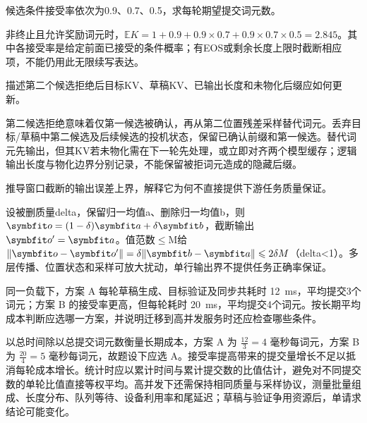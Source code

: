 \begin{exercises}
\begin{exercise} 候选条件接受率依次为0.9、0.7、0.5，求每轮期望提交词元数。

\begin{solution}
非终止且允许奖励词元时，$\mathbb EK=1+0.9+0.9\times0.7+0.9\times0.7\times0.5=2.845$。其中各接受率是给定前面已接受的条件概率；有EOS或剩余长度上限时截断相应项，不能仍用此无限续写表达。
\end{solution}
\end{exercise}

\begin{exercise} 描述第二个候选拒绝后目标KV、草稿KV、已输出长度和未物化后缀应如何更新。

\begin{solution}
第二候选拒绝意味着仅第一候选被确认，再从第二位置残差采样替代词元。丢弃目标/草稿中第二候选及后续候选的投机状态，保留已确认前缀和第一候选。替代词元先输出，但其KV若未物化需在下一轮先处理，或立即对齐两个模型缓存；逻辑输出长度与物化边界分别记录，不能保留被拒词元造成的隐藏后缀。
\end{solution}
\end{exercise}

\begin{exercise}\optional 推导窗口截断的输出误差上界，解释它为何不直接提供下游任务质量保证。

\begin{solution}
设被删质量delta，保留归一均值a、删除归一均值b，则 $\vect{o}=(1-\delta)\vect{a}+\delta \vect{b}$，截断输出 $\vect{o}'=\vect{a}$。值范数$\le$M给 $\|\vect{o}-\vect{o}'\|=\delta\|\vect{b}-\vect{a}\|\le2\delta M$（delta<1）。多层传播、位置状态和采样可放大扰动，单行输出界不提供任务正确率保证。
\end{solution}
\end{exercise}

\begin{exercise} 同一负载下，方案 A 每轮草稿生成、目标验证及同步共耗时 \qty{12}{ms}，平均提交3个词元；方案 B 的接受率更高，但每轮耗时 \qty{20}{ms}，平均提交4个词元。按长期平均成本判断应选哪一方案，并说明迁移到高并发服务时还应检查哪些条件。

\begin{solution}
以总时间除以总提交词元数衡量长期成本，方案 A 为 $\frac{12}{3}=4$ 毫秒每词元，方案 B 为 $\frac{20}{4}=5$ 毫秒每词元，故题设下应选 A。接受率提高带来的提交量增长不足以抵消每轮成本增长。统计时应以累计时间与累计提交数的比值估计，避免对不同提交数的单轮比值直接等权平均。高并发下还需保持相同质量与采样协议，测量批量组成、长度分布、队列等待、设备利用率和尾延迟；草稿与验证争用资源后，单请求结论可能变化。
\end{solution}
\end{exercise}

\end{exercises}
